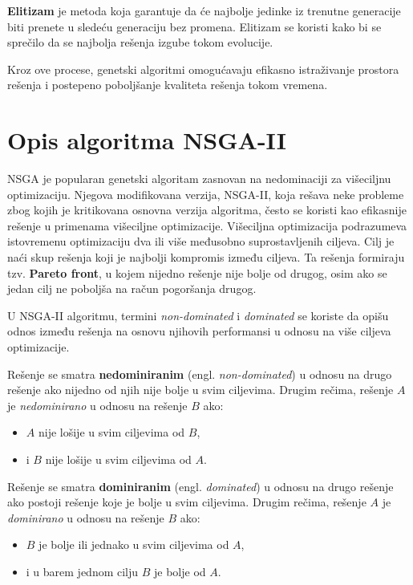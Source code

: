 \documentclass[12pt]{article}
\begin{document}
\textbf{Elitizam} je metoda koja garantuje da će najbolje jedinke iz trenutne generacije biti prenete u sledeću generaciju bez promena. Elitizam se koristi kako bi se sprečilo da se najbolja rešenja izgube tokom evolucije.

Kroz ove procese, genetski algoritmi omogućavaju efikasno istraživanje prostora rešenja i postepeno poboljšanje kvaliteta rešenja tokom vremena.

\section{Opis algoritma NSGA-II}
NSGA je popularan genetski algoritam zasnovan na nedominaciji za višeciljnu optimizaciju. Njegova modifikovana verzija, NSGA-II, koja rešava neke probleme zbog kojih je kritikovana osnovna verzija algoritma, često se koristi kao efikasnije rešenje u primenama višeciljne optimizacije.
Višeciljna optimizacija podrazumeva istovremenu optimizaciju dva ili više međusobno suprostavljenih ciljeva. Cilj je naći skup rešenja koji je najbolji kompromis između ciljeva. Ta rešenja formiraju tzv. \textbf{Pareto front}, u kojem nijedno rešenje nije bolje od drugog, osim ako se jedan cilj ne poboljša na račun pogoršanja drugog.

U NSGA-II algoritmu, termini \textit{non-dominated} i \textit{dominated} se koriste da opišu odnos između rešenja na osnovu njihovih performansi u odnosu na više ciljeva optimizacije.

Rešenje se smatra \textbf{nedominiranim} (engl. \textit{non-dominated}) u odnosu na drugo rešenje ako nijedno od njih nije bolje u svim ciljevima. Drugim rečima, rešenje \(A\) je \textit{nedominirano} u odnosu na rešenje \(B\) ako:

\begin{itemize}
    \item \(A\) nije lošije u svim ciljevima od \(B\),
    \item i \(B\) nije lošije u svim ciljevima od \(A\).
\end{itemize}

Rešenje se smatra \textbf{dominiranim} (engl. \textit{dominated}) u odnosu na drugo rešenje ako postoji rešenje koje je bolje u svim ciljevima. Drugim rečima, rešenje \(A\) je \textit{dominirano} u odnosu na rešenje \(B\) ako:

\begin{itemize}
    \item \(B\) je bolje ili jednako u svim ciljevima od \(A\),
    \item i u barem jednom cilju \(B\) je bolje od \(A\).
\end{itemize}
\end{document}
